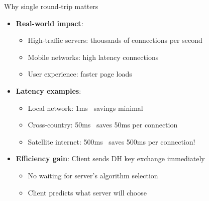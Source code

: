 \documentclass[aspectratio=169, lualatex, handout]{beamer}
\begin{document}
\begin{frame}{Why single round-trip matters}
	\begin{itemize}
		\item \textbf{Real-world impact}:
		      \begin{itemize}
			      \item High-traffic servers: thousands of connections per second
			      \item Mobile networks: high latency connections
			      \item User experience: faster page loads
		      \end{itemize}
		\item \textbf{Latency examples}:
		      \begin{itemize}
			      \item Local network: 1ms \rightarrow\ savings minimal
			      \item Cross-country: 50ms \rightarrow\ saves 50ms per connection
			      \item Satellite internet: 500ms \rightarrow\ saves 500ms per connection!
		      \end{itemize}
		\item \textbf{Efficiency gain}: Client sends DH key exchange immediately
		      \begin{itemize}
			      \item No waiting for server's algorithm selection
			      \item Client predicts what server will choose
		      \end{itemize}
	\end{itemize}
\end{frame}
\end{document}
